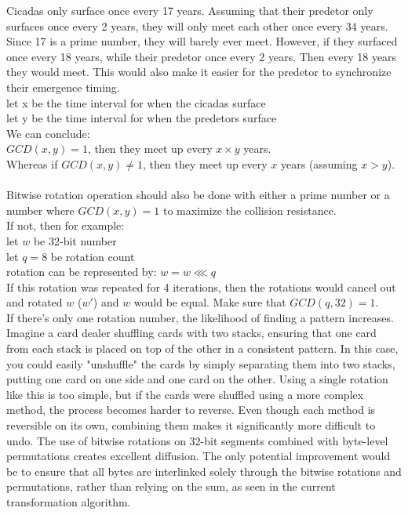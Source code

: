 \documentclass[fleqn, a4paper,12pt]{article}
\begin{document}
Cicadas only surface once every 17 years. Assuming that their predetor only surfaces once every 2 years, they will only meet each other once every 34 years. Since 17 is a prime number, they will barely ever meet. However, if they surfaced once every 18 years, while their predetor once every 2 years. Then every 18 years they would meet. This would also make it easier for the predetor to synchronize their emergence timing.\\
let x be the time interval for when the cicadas surface \\
let y be the time interval for when the predetors surface \\
We can conclude:\\
$GCD(x,y) = 1$, then they meet up every $x \times y$ years. \\
Whereas if $GCD(x,y) \neq 1$, then they meet up every $x$ years (assuming $x > y$). \\
\\
Bitwise rotation operation should also be done with either a prime number or a number where $GCD(x,y) = 1$ to maximize the collision resistance.\\

If not, then for example: \\
let $w$ be 32-bit number\\
let $q = 8$ be rotation count\\
rotation can be represented by: $w = w \lll q$\\
If this rotation was repeated for 4 iterations, then the rotations would cancel out and rotated $w$ ($w'$) and $w$ would be equal. Make sure that $GCD(q, 32) = 1$. \\

If there's only one rotation number, the likelihood of finding a pattern increases. Imagine a card dealer shuffling cards with two stacks, ensuring that one card from each stack is placed on top of the other in a consistent pattern. In this case, you could easily "unshuffle" the cards by simply separating them into two stacks, putting one card on one side and one card on the other. Using a single rotation like this is too simple, but if the cards were shuffled using a more complex method, the process becomes harder to reverse. Even though each method is reversible on its own, combining them makes it significantly more difficult to undo. The use of bitwise rotations on 32-bit segments combined with byte-level permutations creates excellent diffusion. The only potential improvement would be to ensure that all bytes are interlinked solely through the bitwise rotations and permutations, rather than relying on the sum, as seen in the current transformation algorithm.
\end{document}
